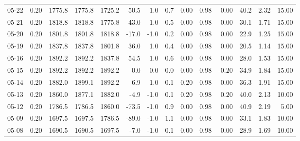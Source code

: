 \begin{threeparttable}
{\begin{tabular}{lrrrrrrrrrrrrr}
  05-22 &     0.20 & 1775.8 & 1775.8 & 1725.2 &       50.5 &                      1.0 &                 0.7 &       0.00 &      0.98 &           0.00 &             40.2 &            2.32 &                  15.00 \\
  05-21 &     0.20 & 1818.8 & 1818.8 & 1775.8 &       43.0 &                      1.0 &                 0.5 &       0.00 &      0.98 &           0.00 &             30.1 &            1.71 &                  15.00 \\
  05-20 &     0.20 & 1801.8 & 1801.8 & 1818.8 &      -17.0 &                     -1.0 &                 0.2 &       0.00 &      0.98 &           0.00 &             22.9 &            1.25 &                  15.00 \\
  05-19 &     0.20 & 1837.8 & 1837.8 & 1801.8 &       36.0 &                      1.0 &                 0.4 &       0.00 &      0.98 &           0.00 &             20.5 &            1.14 &                  15.00 \\
  05-16 &     0.20 & 1892.2 & 1892.2 & 1837.8 &       54.5 &                      1.0 &                 0.6 &       0.00 &      0.98 &           0.00 &             28.0 &            1.53 &                  15.00 \\
  05-15 &     0.20 & 1892.2 & 1892.2 & 1892.2 &        0.0 &                      0.0 &                 0.0 &       0.00 &      0.98 &          -0.20 &             34.9 &            1.84 &                  15.00 \\
  05-14 &     0.20 & 1882.0 & 1899.1 & 1892.2 &        6.9 &                      1.0 &                 0.1 &       0.20 &      0.98 &           0.00 &             36.3 &            1.91 &                  15.00 \\
  05-13 &     0.20 & 1860.0 & 1877.1 & 1882.0 &       -4.9 &                     -1.0 &                 0.1 &       0.20 &      0.98 &           0.20 &             40.0 &            2.13 &                  10.00 \\
  05-12 &     0.20 & 1786.5 & 1786.5 & 1860.0 &      -73.5 &                     -1.0 &                 0.9 &       0.00 &      0.98 &           0.00 &             40.9 &            2.19 &                   5.00 \\
  05-09 &     0.20 & 1697.5 & 1697.5 & 1786.5 &      -89.0 &                     -1.0 &                 1.1 &       0.00 &      0.98 &           0.00 &             33.1 &            1.83 &                  10.00 \\
  05-08 &     0.20 & 1690.5 & 1690.5 & 1697.5 &       -7.0 &                     -1.0 &                 0.1 &       0.00 &      0.98 &           0.00 &             28.9 &            1.69 &                  10.00 \\

\end{tabular}}
\end{threeparttable}
